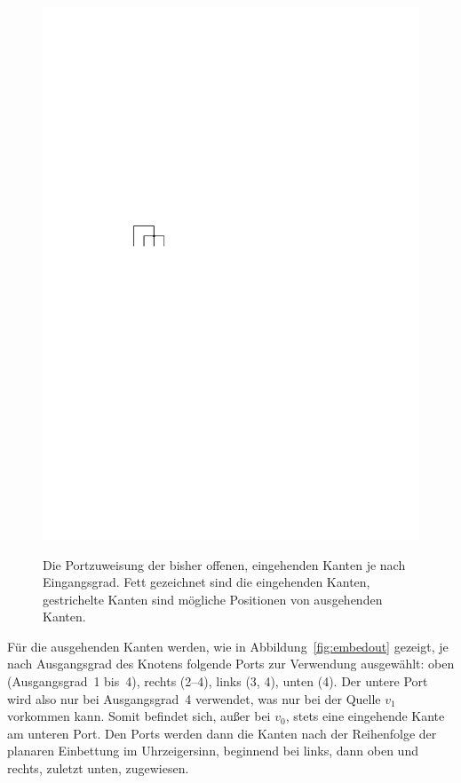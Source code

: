 \documentclass[a4paper]{scrreprt}
\theoremstyle{definition}
\begin{document}
\begin{figure}[h]
            {\includegraphics[scale=.8]{oc3_embed/incoming/indeg4}}

        \caption{Die Portzuweisung der bisher offenen, eingehenden Kanten je nach Eingangsgrad. Fett gezeichnet sind die eingehenden Kanten, gestrichelte Kanten sind mögliche Positionen von ausgehenden Kanten.}
        \label{fig:embedin}
\end{figure}

Für die ausgehenden Kanten werden, wie in Abbildung~\ref{fig:embedout} gezeigt, je nach Ausgangsgrad des Knotens folgende Ports zur Verwendung ausgewählt: oben (Ausgangsgrad~1 bis~4), rechts (2--4), links (3, 4), unten (4). Der untere Port wird also nur bei Ausgangsgrad~4 verwendet, was nur bei der Quelle $v_1$ vorkommen kann. Somit befindet sich, außer bei $v_0$, stets eine eingehende Kante am unteren Port. Den Ports werden dann die Kanten nach der Reihenfolge der planaren Einbettung im Uhrzeigersinn, beginnend bei links, dann oben und rechts, zuletzt unten, zugewiesen.
\end{document}
